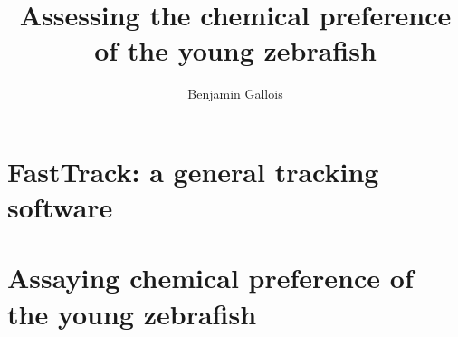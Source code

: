 \documentclass[11pt,a4paper]{report}
\title{Assessing the chemical preference of the young zebrafish}
\author{Benjamin Gallois}
\begin{document}



\newpage


\tableofcontents

\part{FastTrack: a general tracking software}


\part{Assaying chemical preference of the young zebrafish}




\end{document}
